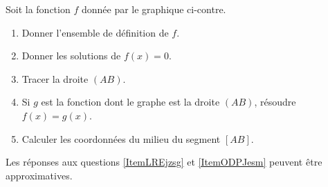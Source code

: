 
\begin{exercice}\label{exosmath-0006}

    \begin{multicols}{2}
    Soit la fonction \( f\) donnée par le graphique ci-contre.
        \begin{enumerate}
            \item
                Donner l'ensemble de définition de \( f\).
            \item\label{ItemLREjzsg}
                Donner les solutions de \( f(x)=0\).
            \item 
                Tracer la droite \( (AB)\).
            \item\label{ItemODPJesm}
                Si \( g\) est la fonction dont le graphe est la droite \( (AB)\), résoudre \( f(x)=g(x)\).
            \item
                Calculer les coordonnées du milieu du segment \( [AB]\).
        \end{enumerate}


        \columnbreak


    \end{multicols}
    Les réponses aux questions \ref{ItemLREjzsg} et \ref{ItemODPJesm} peuvent être approximatives.
        

\end{exercice}
